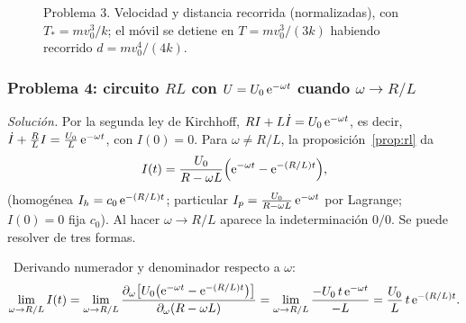 \documentclass[11pt,twoside]{article}
\newcommand\encab[1]{\par\addvspace{4pt}\noindent{\color{acc}\bfseries #1.}\ \ignorespaces}
\newcommand\leyenda[2]{\textcolor{#1}{\rule[2.2pt]{11pt}{1.1pt}}\ #2}
\begin{document}
\begin{figure}[!htbp]
\centering
{}
\caption{Problema 3. Velocidad y distancia recorrida (normalizadas), con $T_*=mv_0^3/k$; el móvil se detiene en
$T=mv_0^3/(3k)$ habiendo recorrido $d=mv_0^4/(4k)$.}
\label{fig:p3}
\end{figure}

\subsubsection*{Problema 4: circuito $RL$ con $U=U_0\,\mathrm{e}^{-\omega t}$ cuando $\omega\to R/L$}

\emph{Solución.} Por la segunda ley de Kirchhoff, $RI+L\dot I=U_0\,\mathrm{e}^{-\omega t}$, es decir,
$\dot I+\frac RLI=\frac{U_0}{L}\,\mathrm{e}^{-\omega t}$, con $I(0)=0$. Para $\omega\neq R/L$, la proposición~\ref{prop:rl} da
\begin{equation*}
I(t)=\frac{U_0}{R-\omega L}\Big(\mathrm{e}^{-\omega t}-\mathrm{e}^{-(R/L)t}\Big),
\end{equation*}
(homogénea $I_h=c_0\,\mathrm{e}^{-(R/L)t}$; particular $I_p=\frac{U_0}{R-\omega L}\,\mathrm{e}^{-\omega t}$ por Lagrange; $I(0)=0$ fija $c_0$). Al
hacer $\omega\to R/L$ aparece la indeterminación $0/0$. Se puede resolver de tres formas.

\encab{Método A: regla de L'Hôpital}Derivando numerador y denominador respecto a $\omega$:
\begin{equation*}
\lim_{\omega\to R/L}I(t)=\lim_{\omega\to R/L}\frac{\partial_\omega\big[U_0\big(\mathrm{e}^{-\omega t}-\mathrm{e}^{-(R/L)t}\big)\big]}{\partial_\omega(R-\omega L)}
=\lim_{\omega\to R/L}\frac{-U_0\,t\,\mathrm{e}^{-\omega t}}{-L}=\frac{U_0}{L}\,t\,\mathrm{e}^{-(R/L)t}.
\end{equation*}
\end{document}
